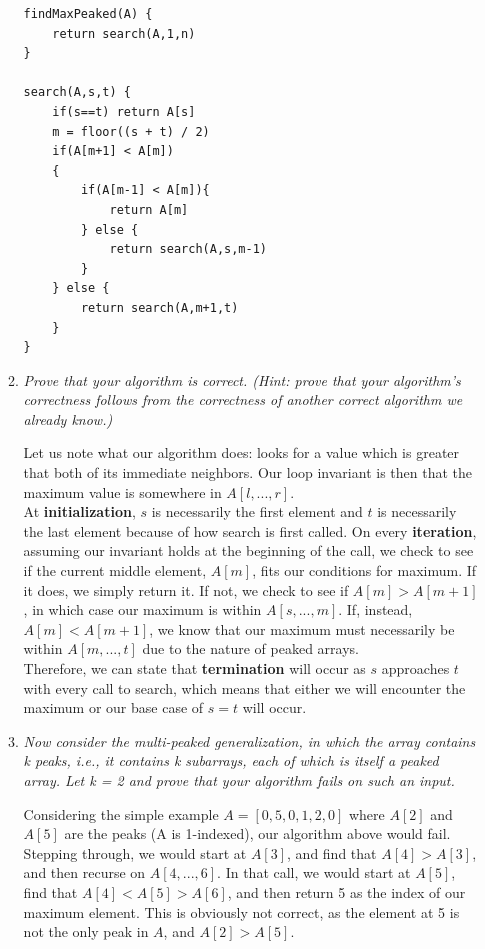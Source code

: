 \documentclass[12pt]{article}
\begin{document}
\begin{enumerate}
\begin{enumerate}
        \begin{verbatim}
findMaxPeaked(A) {
    return search(A,1,n) 
}

search(A,s,t) {
    if(s==t) return A[s]
    m = floor((s + t) / 2)
    if(A[m+1] < A[m])
    {
        if(A[m-1] < A[m]){
            return A[m]
        } else {
            return search(A,s,m-1)
        }
    } else {
        return search(A,m+1,t)
    }
}
        \end{verbatim}
        
    	\item \textit{Prove that your algorithm is correct. (Hint: prove that your algorithm's correctness follows from the correctness of another correct algorithm we already know.)}
    	
    	Let us note what our algorithm does: looks for a value which is greater that both of its immediate neighbors. Our loop invariant is then that the maximum value is somewhere in $A[l,...,r]$. \\
    	
    	At \textbf{initialization}, $s$ is necessarily the first element and $t$ is necessarily the last element because of how \textsf{search} is first called. On every \textbf{iteration}, assuming our invariant holds at the 
beginning of the call, we check to see if the current middle element, $A[m]$, fits our conditions for maximum. If it does, we simply return it. If not, we check to see if $A[m]>A[m+1]$, in which case our maximum is within 
$A[s,...,m]$. If, instead, $A[m]<A[m+1]$, we know that our maximum must necessarily be within $A[m,...,t]$ due to the nature of peaked arrays.\\
    	
    	Therefore, we can state that \textbf{termination} will occur as $s$ approaches $t$ with every call to \textsf{search}, which means that either we will encounter the maximum or our base case of $s=t$ will occur. \\
    
    	\item \textit{Now consider the multi-peaked generalization, in which the array contains k peaks, i.e., it contains k subarrays, each of which is itself a peaked array. Let k = 2 and prove that your algorithm fails on such 
an input.}
    	
    	Considering the simple example $A = [0,5,0,1,2,0]$ where $A[2]$ and $A[5]$ are the peaks (A is 1-indexed), our algorithm above would fail. Stepping through, we would start at $A[3]$, and find that $A[4] > A[3]$, and then 
recurse on $A[4,...,6]$. In that call, we would start at $A[5]$, find that $A[4] < A[5] > A[6]$, and then return 5 as the index of our maximum element. This is obviously not correct, as the element at 5 is not the only peak in $A$, 
and $A[2]>A[5]$. \\
    

\end{enumerate}
\end{enumerate}
\end{document}
